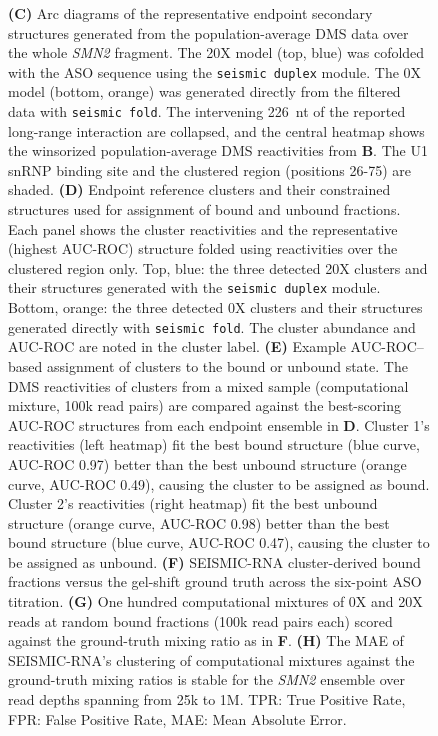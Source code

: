 \documentclass[unnumsec,webpdf,contemporary,large]{oup-authoring-template}%
\theoremstyle{thmstyleone}%
\theoremstyle{thmstyletwo}%
\theoremstyle{thmstylethree}%
\begin{document}
\begin{figure}[!t]
    \caption[]{\textbf{(C)} Arc diagrams of the representative endpoint secondary structures generated from the population-average DMS data over the whole \textit{SMN2} fragment. The 20X model (top, blue) was cofolded with the ASO sequence using the \texttt{seismic duplex} module. The 0X model (bottom, orange) was generated directly from the filtered data with \texttt{seismic fold}. The intervening 226~nt of the reported long-range interaction are collapsed, and the central heatmap shows the winsorized population-average DMS reactivities from \textbf{B}. The U1 snRNP binding site and the clustered region (positions 26-75) are shaded. \textbf{(D)} Endpoint reference clusters and their constrained structures used for assignment of bound and unbound fractions. Each panel shows the cluster reactivities and the representative (highest AUC-ROC) structure folded using reactivities over the clustered region only. Top, blue: the three detected 20X clusters and their structures generated with the \texttt{seismic duplex} module. Bottom, orange: the three detected 0X clusters and their structures generated directly with \texttt{seismic fold}. The cluster abundance and AUC-ROC are noted in the cluster label. \textbf{(E)} Example AUC-ROC--based assignment of clusters to the bound or unbound state. The DMS reactivities of clusters from a mixed sample (computational mixture, 100k read pairs) are compared against the best-scoring AUC-ROC structures from each endpoint ensemble in \textbf{D}. Cluster 1's reactivities (left heatmap) fit the best bound structure (blue curve, AUC-ROC 0.97) better than the best unbound structure (orange curve, AUC-ROC 0.49), causing the cluster to be assigned as bound. Cluster 2's reactivities (right heatmap) fit the best unbound structure (orange curve, AUC-ROC 0.98) better than the best bound structure (blue curve, AUC-ROC 0.47), causing the cluster to be assigned as unbound. \textbf{(F)} SEISMIC-RNA cluster-derived bound fractions versus the gel-shift ground truth across the six-point ASO titration. \textbf{(G)} One hundred computational mixtures of 0X and 20X reads at random bound fractions (100k read pairs each) scored against the ground-truth mixing ratio as in \textbf{F}. \textbf{(H)} The MAE of SEISMIC-RNA's clustering of computational mixtures against the ground-truth mixing ratios is stable for the \textit{SMN2} ensemble over read depths spanning from 25k to 1M. TPR: True Positive Rate, FPR: False Positive Rate, MAE: Mean Absolute Error.}
\end{figure}
\end{document}
